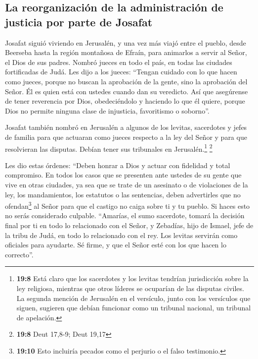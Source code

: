 \hypertarget{la-reorganizaciuxf3n-de-la-administraciuxf3n-de-justicia-por-parte-de-josafat}{%
\subsection{La reorganización de la administración de justicia por parte
de
Josafat}\label{la-reorganizaciuxf3n-de-la-administraciuxf3n-de-justicia-por-parte-de-josafat}}

 Josafat siguió viviendo en Jerusalén, y una vez más viajó
entre el pueblo, desde Beerseba hasta la región montañosa de Efraín,
para animarlos a servir al Señor, el Dios de sus padres. 
Nombró jueces en todo el país, en todas las ciudades fortificadas de
Judá.  Les dijo a los jueces: ``Tengan cuidado con lo que
hacen como jueces, porque no buscan la aprobación de la gente, sino la
aprobación del Señor. Él es quien está con ustedes cuando dan su
veredicto.  Así que asegúrense de tener reverencia por
Dios, obedeciéndolo y haciendo lo que él quiere, porque Dios no permite
ninguna clase de injusticia, favoritismo o soborno''.

 Josafat también nombró en Jerusalén a algunos de los
levitas, sacerdotes y jefes de familia para que actuaran como jueces
respecto a la ley del Señor y para que resolvieran las disputas. Debían
tener sus tribunales en Jerusalén.\footnote{\textbf{19:8} Está claro que
  los sacerdotes y los levitas tendrían jurisdicción sobre la ley
  religiosa, mientras que otros líderes se ocuparían de las disputas
  civiles. La segunda mención de Jerusalén en el versículo, junto con
  los versículos que siguen, sugieren que debían funcionar como un
  tribunal nacional, un tribunal de apelación.} \footnote{\textbf{19:8}
  Deut 17,8-9; Deut 19,17}

 Les dio estas órdenes: ``Deben honrar a Dios y actuar con
fidelidad y total compromiso.  En todos los casos que se
presenten ante ustedes de su gente que vive en otras ciudades, ya sea
que se trate de un asesinato o de violaciones de la ley, los
mandamientos, los estatutos o las sentencias, deben advertirles que no
ofendan\footnote{\textbf{19:10} Esto incluiría pecados como el perjurio
  o el falso testimonio.} al Señor para que el castigo no caiga sobre ti
y tu pueblo. Si haces esto no serás considerado culpable.
 ``Amarías, el sumo sacerdote, tomará la decisión final
por ti en todo lo relacionado con el Señor, y Zebadías, hijo de Ismael,
jefe de la tribu de Judá, en todo lo relacionado con el rey. Los levitas
servirán como oficiales para ayudarte. Sé firme, y que el Señor esté con
los que hacen lo correcto''.

